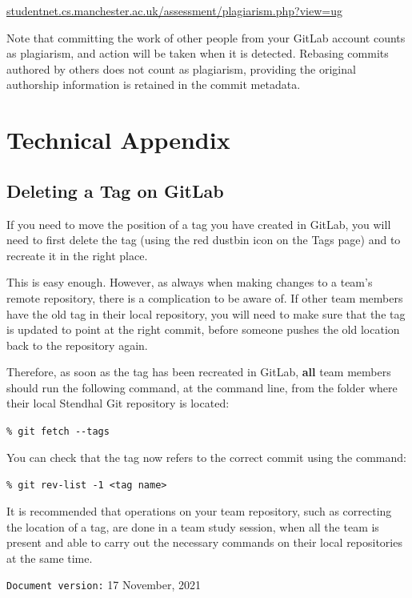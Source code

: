 \documentclass[
]{book}
\begin{document}
\href{http://studentnet.cs.manchester.ac.uk/assessment/plagiarism.php?view=ug}{studentnet.cs.manchester.ac.uk/assessment/plagiarism.php?view=ug}

Note that committing the work of other people from your GitLab account counts as plagiarism, and action will be taken when it is detected. Rebasing commits authored by others does not count as plagiarism, providing the original authorship information is retained in the commit metadata.

\hypertarget{technical-appendix}{%
\section{Technical Appendix}\label{technical-appendix}}

\hypertarget{delab}{%
\subsection{Deleting a Tag on GitLab}\label{delab}}

If you need to move the position of a tag you have created in GitLab, you will need to first delete the tag (using the red dustbin icon on the Tags page) and to recreate it in the right place.

This is easy enough. However, as always when making changes to a team's remote repository, there is a complication to be aware of. If other team members have the old tag in their local repository, you will need to make sure that the tag is updated to point at the right commit, before someone pushes the old location back to the repository again.

Therefore, as soon as the tag has been recreated in GitLab, \textbf{all} team members should run the following command, at the command line, from the folder where their local Stendhal Git repository is located:

\texttt{\%\ git\ fetch\ -\/-tags}

You can check that the tag now refers to the correct commit using the command:

\texttt{\%\ git\ rev-list\ -1\ \textless{}tag\ name\textgreater{}}

It is recommended that operations on your team repository, such as correcting the location of a tag, are done in a team study session, when all the team is present and able to carry out the necessary commands on their local repositories at the same time.

\texttt{Document\ version:} 17 November, 2021
\end{document}
